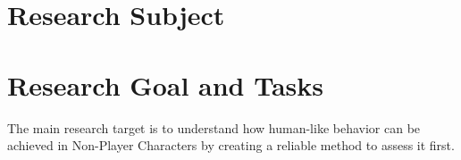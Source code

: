\documentclass{VUMIFPS-master-intro}
\begin{document}


\section{Research Subject}


\section{Research Goal and Tasks}



The main research target is to understand how human-like behavior can be achieved in Non-Player Characters by creating a reliable method to assess it first.
\end{document}
